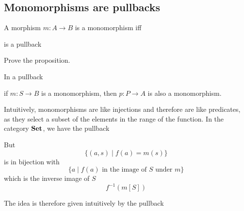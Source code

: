 \subsection{Monomorphisms are pullbacks}

\begin{proposition}
A morphism $m: A \to B$ is a monomorphism iff 

\begin{center}
\end{center}
is a pullback
\end{proposition}

\begin{exercise}
	Prove the proposition.
\end{exercise}

\begin{proposition}
In a pullback
\begin{center}
\end{center}
if $m: S \to B$ is a monomorphism, then $p: P \to A$ is also a monomorphism.
\end{proposition}
Intuitively, monomorphisms are like injections and therefore are like predicates, as they select a subset of the elements in the range of the function. In the category $\mathbf {Set}$, we have the pullback 
\begin{center}
\end{center}
But
\[ \{ (a,s) \mid f(a) = m(s) \} \]
is in bijection with
\[ \{ a \mid f(a) \text{ in the image of } S \text{ under } m \} \]
which is the inverse image of $S$
\[ f^{-1}(m[S])\]

The idea is therefore given intuitively by the pullback
\begin{center}
\end{center}

